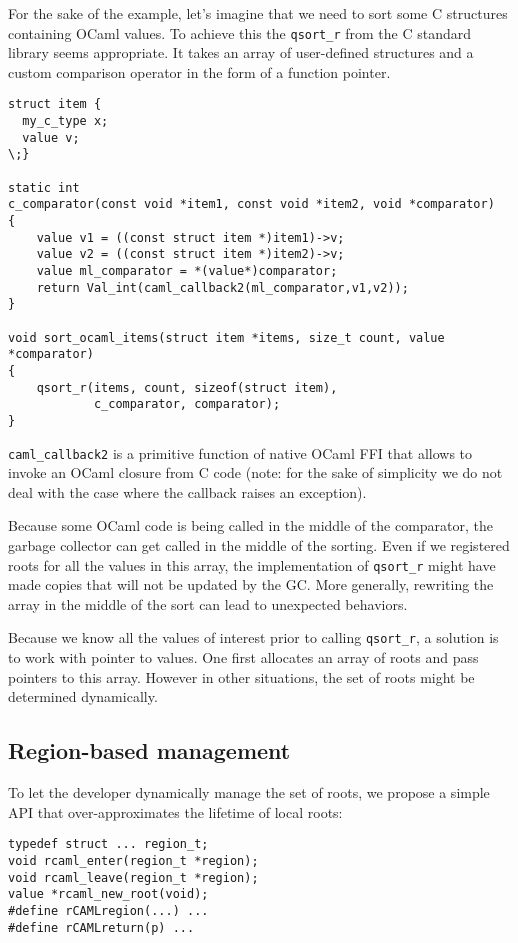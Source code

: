 \documentclass[a4paper]{easychair}
\begin{document}
For the sake of the example, let's imagine that we need to sort some C
structures containing OCaml values. To achieve this the
\texttt{qsort\_r} from the C standard library seems appropriate. It
takes an array of user-defined structures and a custom comparison
operator in the form of a function pointer.

\begin{lstlisting}[]
struct item {
  my_c_type x;
  value v;
\;}

static int
c_comparator(const void *item1, const void *item2, void *comparator)
{
    value v1 = ((const struct item *)item1)->v;
    value v2 = ((const struct item *)item2)->v;
    value ml_comparator = *(value*)comparator;
    return Val_int(caml_callback2(ml_comparator,v1,v2));
}

void sort_ocaml_items(struct item *items, size_t count, value *comparator)
{
    qsort_r(items, count, sizeof(struct item),
            c_comparator, comparator);
}
\end{lstlisting}

\texttt{caml\_callback2} is a primitive function of native OCaml FFI
that allows to invoke an OCaml closure from C code (note: for the sake
of simplicity we do not deal with the case where the callback raises an
exception).

Because some OCaml code is being called in the middle of the comparator,
the garbage collector can get called in the middle of the sorting. Even
if we registered roots for all the values in this array, the
implementation of \texttt{qsort\_r} might have made copies that will not
be updated by the GC. More generally, rewriting the array in the middle
of the sort can lead to unexpected behaviors.

Because we know all the values of interest prior to calling
\texttt{qsort\_r}, a solution is to work with pointer to values. One
first allocates an array of roots and pass pointers to this array.
However in other situations, the set of roots might be determined
dynamically.

\subsection{Region-based management}

To let the developer dynamically manage the set of roots, we propose a
simple API that over-approximates the lifetime of local roots:

\begin{lstlisting}[]
typedef struct ... region_t;
void rcaml_enter(region_t *region);
void rcaml_leave(region_t *region);
value *rcaml_new_root(void);
#define rCAMLregion(...) ...
#define rCAMLreturn(p) ...
\end{lstlisting}
\end{document}
